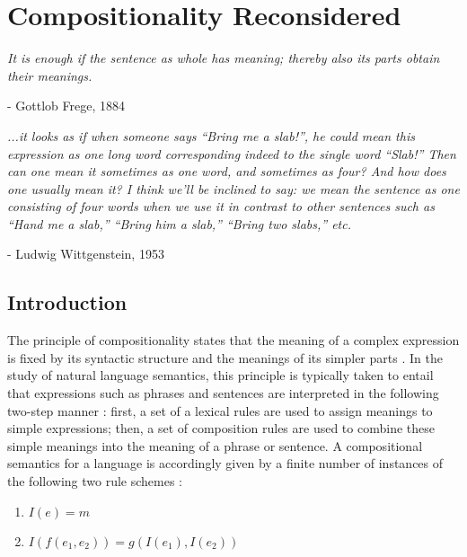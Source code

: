 
\chapter{Compositionality Reconsidered}
\renewcommand{\epigraphrule}{0pt}
\setlength{\epigraphwidth}{4.5in}
\epigraph{\textit{It is enough if the sentence as whole has meaning; thereby also its parts obtain their meanings.}}{- Gottlob Frege, 1884\footnotemark} 

\epigraph{\textit{...it looks as if when someone says ``Bring me a slab!'', he could mean this expression as one long word corresponding indeed to the single word ``Slab!'' Then can one mean it sometimes as one word, and sometimes as four? And how does one usually mean it? I think we'll be inclined to say: we mean the sentence as one consisting of four words when we use it in contrast to other sentences such as ``Hand me a slab,'' ``Bring him a slab,'' ``Bring two slabs,'' etc.}}{- Ludwig Wittgenstein, 1953}

\section{Introduction}

The principle of compositionality states that the meaning of a complex expression is fixed by its syntactic structure and the meanings of its simpler parts \citep{Szabo:2013,Szabo:2012,FodorLepore:1991}. In the study of natural language semantics, this principle is typically taken to entail that expressions such as phrases and sentences are interpreted in the following two-step manner \citep{Recanati:2012}: first, a set of a lexical rules are used to assign meanings to simple expressions; then, a set of composition rules are used to combine these simple meanings into the meaning of a phrase or sentence. A compositional semantics for a language is accordingly given by a finite number of instances of the following two rule schemes \citep[pp. 175-76]{Recanati:2012}:


\begin{enumerate}
  \item $ I(e) = m $
  \item $ I(f(e_1, e_2)) = g(I(e_1),I(e_2)) $
\end{enumerate}


